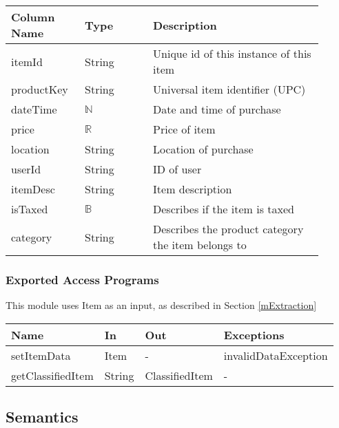 \documentclass[12pt, titlepage]{article}
\begin{document}
\begin{table}[H]
  \begin{tabular}{|p{0.2\linewidth}|p{0.2\linewidth}|p{0.5\linewidth}|}
    \hline
    \textbf{Column Name} & \textbf{Type} & \textbf{Description} \\
    \hline
    itemId & String & Unique id of this instance of this item \\
    \hline
    productKey & String & Universal item identifier (UPC) \\
    \hline
    dateTime & $\mathbb{N}$ & Date and time of purchase \\
    \hline
    price & $\mathbb{R}$ & Price of item \\
    \hline
    location & String & Location of purchase \\
    \hline
    userId & String & ID of user\\
    \hline
    itemDesc & String & Item description\\
    \hline
    isTaxed & $\mathbb{B}$ & Describes if the item is taxed\\
    \hline
    category & String & Describes the product category the item belongs to\\
    \hline
  \end{tabular}
\end{table}

\subsubsection{Exported Access Programs}

This module uses Item as an input, as described in Section \ref{mExtraction}

\begin{center}
    \begin{tabular}{p{5cm} p{4cm} p{3cm} p{4cm}}
    \hline
    \textbf{Name} & \textbf{In} & \textbf{Out} & \textbf{Exceptions} \\
    \hline
    setItemData & Item & - & invalidDataException \\
    getClassifiedItem & String & ClassifiedItem & - \\
    \hline
    \end{tabular}
\end{center}

\subsection{Semantics}
\end{document}
